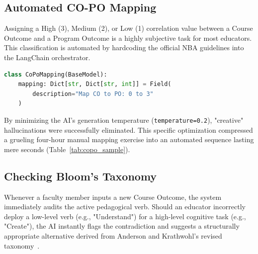 \documentclass[conference]{IEEEtran}
\begin{document}
\subsection{Automated CO-PO Mapping}
Assigning a High (3), Medium (2), or Low (1) correlation value between a Course Outcome and a Program Outcome is a highly subjective task for most educators. This classification is automated by hardcoding the official NBA guidelines into the LangChain orchestrator. 

\noindent\begin{minipage}{\columnwidth}
\begin{lstlisting}[language=Python, basicstyle=\footnotesize\ttfamily, breaklines=true, frame=single, showstringspaces=false, captionpos=b, caption={Using Pydantic to Enforce JSON Structure}, label={lst:copo}]
class CoPoMapping(BaseModel):
    mapping: Dict[str, Dict[str, int]] = Field(
        description="Map CO to PO: 0 to 3"
    )
\end{lstlisting}
\end{minipage}

By minimizing the AI's generation temperature (\texttt{temperature=0.2}), "creative" hallucinations were successfully eliminated. This specific optimization compressed a grueling four-hour manual mapping exercise into an automated sequence lasting mere seconds (Table~\ref{tab:copo_sample}).

\begin{table}[htbp]
\caption{AI-Generated CO-PO Matrix (Exploratory Data Analysis)}
\label{tab:copo_sample}
\centering
{}
\end{table}

\subsection{Checking Bloom's Taxonomy}
Whenever a faculty member inputs a new Course Outcome, the system immediately audits the active pedagogical verb. Should an educator incorrectly deploy a low-level verb (e.g., "Understand") for a high-level cognitive task (e.g., "Create"), the AI instantly flags the contradiction and suggests a structurally appropriate alternative derived from Anderson and Krathwohl's revised taxonomy~\cite{anderson2001}.
\end{document}
